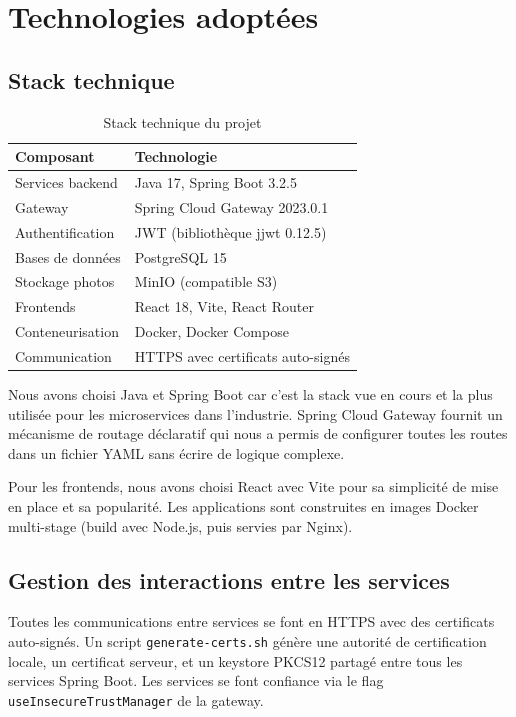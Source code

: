 \documentclass[12pt, a4paper]{article}
\begin{document}
\section{Technologies adoptées}

\subsection{Stack technique}

\begin{table}[H]
\centering
\begin{tabularx}{\textwidth}{|l|X|}
\hline
\textbf{Composant} & \textbf{Technologie} \\
\hline
Services backend & Java 17, Spring Boot 3.2.5 \\
\hline
Gateway & Spring Cloud Gateway 2023.0.1 \\
\hline
Authentification & JWT (bibliothèque jjwt 0.12.5) \\
\hline
Bases de données & PostgreSQL 15 \\
\hline
Stockage photos & MinIO (compatible S3) \\
\hline
Frontends & React 18, Vite, React Router \\
\hline
Conteneurisation & Docker, Docker Compose \\
\hline
Communication & HTTPS avec certificats auto-signés \\
\hline
\end{tabularx}
\caption{Stack technique du projet}
\end{table}

Nous avons choisi Java et Spring Boot car c'est la stack vue en cours et la plus utilisée pour les microservices dans l'industrie. Spring Cloud Gateway fournit un mécanisme de routage déclaratif qui nous a permis de configurer toutes les routes dans un fichier YAML sans écrire de logique complexe.

Pour les frontends, nous avons choisi React avec Vite pour sa simplicité de mise en place et sa popularité. Les applications sont construites en images Docker multi-stage (build avec Node.js, puis servies par Nginx).

\subsection{Gestion des interactions entre les services}

Toutes les communications entre services se font en HTTPS avec des certificats auto-signés. Un script \texttt{generate-certs.sh} génère une autorité de certification locale, un certificat serveur, et un keystore PKCS12 partagé entre tous les services Spring Boot. Les services se font confiance via le flag \texttt{useInsecureTrustManager} de la gateway.
\end{document}
